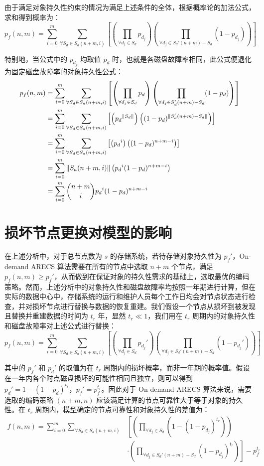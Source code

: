 由于满足对象持久性约束的情况为满足上述条件的全体，根据概率论的加法公式，求和得到概率为：
$$
p_{f}(n,m)=\sum_{i=0}^{m}\sum_{{\forall}S_{d}{\in}S_{a}(n+m,i)}\left[\left(\prod_{{\forall}d_{j}{\in}S_{d}}{p_{d_j}}\right)\left(\prod_{{\forall}d_{j}{\in}S_{d}'(n+m)-S_{d}}(1-p_{d_j})\right)\right]
$$

特别地，当公式中的 $p_{d_j}$ 均取值 $p_d$ 时，也就是各磁盘故障率相同，此公式便退化为固定磁盘故障率的对象持久性公式：
\begin{align*}
p_{f}(n,m)&=\sum_{i=0}^{m}\sum_{{\forall}S_{d}{\in}S_{a}(n+m,i)}\left[\left(\prod_{{\forall}d_{j}{\in}S_{d}}{p_d}\right)\left(\prod_{{\forall}d_{j}{\in}S_{d}'(n+m)-S_{d}}(1-p_d)\right)\right]\\
&=\sum_{i=0}^{m}\sum_{{\forall}S_{d}{\in}S_{a}(n+m,i)}\left[\left({p_d}^{\|S_{d}\|}\right)\left((1-p_d)^{\|S_{d}'(n+m)-S_{d}\|}\right)\right]\\
&=\sum_{i=0}^{m}\sum_{{\forall}S_{d}{\in}S_{a}(n+m,i)}\left[\left({p_d}^{i}\right)\left((1-p_d)^{n+m-i}\right)\right]\\
&=\sum_{i=0}^{m}\|S_{a}(n+m,i)\|\left({p_d}^{i}(1-p_d)^{n+m-i}\right)\\
&=\sum_{i=0}^{m}\dbinom{n+m}{i}{p_d}^{i}(1-p_d)^{n+m-i}
\end{align*}
\section{损坏节点更换对模型的影响}
在上述分析中，对于总节点数为 $s$ 的存储系统，若待存储对象持久性为 $p_{f}'$，On-demand ARECS 算法需要在所有的节点中选取 $n+m$ 个节点，满足 $p_{f}(n,m) \geq p_{f}'$，从而做到在保证对象的持久性需求的基础上，选取最优的编码策略。然而，上述分析中的对象持久性和磁盘故障率均按照一年期进行计算，但在实际的数据中心中，存储系统的运行和维护人员每个工作日均会对节点状态进行检查，并对损坏节点进行替换与数据的恢复重建。我们假设一个节点从损坏到被发现且替换并重建数据的时间为 $t_{r}$ 年，显然 $t_{r}{\ll}1$，我们用在 $t_{r}$ 周期内的对象持久性和磁盘故障率对上述公式进行替换：
$$
p_{f}(n,m)=\sum_{i=0}^{m}\sum_{{\forall}S_{d}{\in}S_{a}(n+m,i)}\left[\left(\prod_{{\forall}d_{j}{\in}S_{d}}{p_{d_j}'}\right)\left(\prod_{{\forall}d_{j}{\in}S_{d}'(n+m)-S_{d}}(1-p_{d_j}')\right)\right]
$$

其中的 $p_{f}'$ 和 $p_{d}'$ 的取值为在 $t_{r}$ 周期内的损坏概率，而非一年期的概率值。假设在一年内各个时点磁盘损坏的可能性相同且独立，则可以得到 $p_{d}'=1-(1-p_{d})^{t_{r}}$，$p_{f}'=p_{f}^{t_{r}}$。因此对于 On-demand ARECS 算法来说，需要选取的编码策略 $(n+m,n)$ 应该满足计算的节点可靠性大于等于对象的持久性。在 $t_{r}$ 周期内，模型确定的节点可靠性和对象持久性的差值为：
\begin{align*}
f(n,m)=\sum_{i=0}^{m}\sum_{{\forall}S_{d}{\in}S_{a}(n+m,i)}&\left[\left(\prod_{{\forall}d_{j}{\in}S_{d}}\left(1-(1-p_{d_j})^{t_r}\right)\right)\right.\\
&\cdot\left.\left(\prod_{{\forall}d_{j}{\in}S_{d}'(n+m)-S_{d}}(1-p_{d_j})^{t_{r}}\right)\right]-p_{f}^{t_{r}}
\end{align*}

